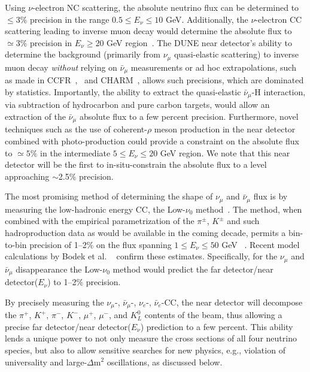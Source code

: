 
Using  $\nu$-electron NC scattering, the absolute neutrino flux can be determined 
to $\leq 3\%$ precision in the range $0.5 \leq E_\nu \leq 10$ GeV. Additionally, the $\nu$-electron CC scattering leading to  inverse 
muon decay would determine the absolute flux to $\simeq 3\%$ precision in $E_\nu \geq 20$ GeV region~\cite{ABS-FLUX}. 
The DUNE near detector's ability to determine the background (primarily from $\nu_{\mu}$ quasi-elastic scattering) 
to inverse muon decay \textit{without} relying on $\bar \nu_\mu$ measurements or 
ad hoc extrapolations, such as made in CCFR~\cite{CCFR-IMD-Mishra-89},~\cite{CCFR-IMD-Mishra-90} 
and CHARM~\cite{CHARM-IMD-95}, allows such precisions, which are dominated by statistics. 
Importantly, the ability to extract the quasi-elastic 
$\bar \nu_\mu$-H interaction, via subtraction of hydrocarbon and pure carbon targets, would allow an extraction of 
the $\bar \nu_\mu$ absolute flux to a few percent precision. Furthermore, novel techniques such as the use of 
coherent-$\rho$ meson production in the near detector combined with photo-production could provide a constraint 
on the absolute flux to $\simeq 5\%$ in the intermediate $5 \leq E_\nu \leq 20$ GeV region. 
We note that this near detector will be the first %
to in-situ-constrain the absolute flux to a level approaching $\sim$2.5\% precision. 

The most promising method of determining 
the shape of  $\nu_\mu$ and $\bar \nu_\mu$ flux is by measuring the low-hadronic energy CC, the Low-$\nu_0$
method~\cite{MISHRA-Nu0}. The method, when combined with the empirical parametrization of the $\pi^{\pm}$, $K^{\pm}$ 
and such hadroproduction data as would be available in the coming decade, permits a bin-to-bin precision of 1--2\% on 
the flux spanning $1 \leq E_\nu \leq 50$ GeV ~\cite{near detector-REL-FLUX}. 
Recent model calculations by Bodek et al. ~\cite{Bodek:2012uu} confirm these estimates. 
Specifically, for the $\nu_\mu$ and $\bar \nu_\mu$ disappearance the Low-$\nu_0$ method would predict the 
far detector/near detector($E_\nu$) to 1--2\% precision. 

By precisely measuring the $\nu_\mu$-, $\bar \nu_\mu$-, $\nu_e$-, $\bar \nu_e$-CC, 
the near detector will decompose the $\pi^+$, $K^+$, $\pi^-$, $K^-$, $\mu^+$, $\mu^-$, and $K^0_L$ contents of the beam, thus 
allowing a precise far detector/near detector($E_\nu$) prediction to a few percent.  This ability lends a unique power to 
not only measure the cross sections of all four neutrino species, but also to allow sensitive searches for new 
physics, e.g., violation of universality and large-$\Delta$m$^2$ oscillations, as discussed %
below. 

